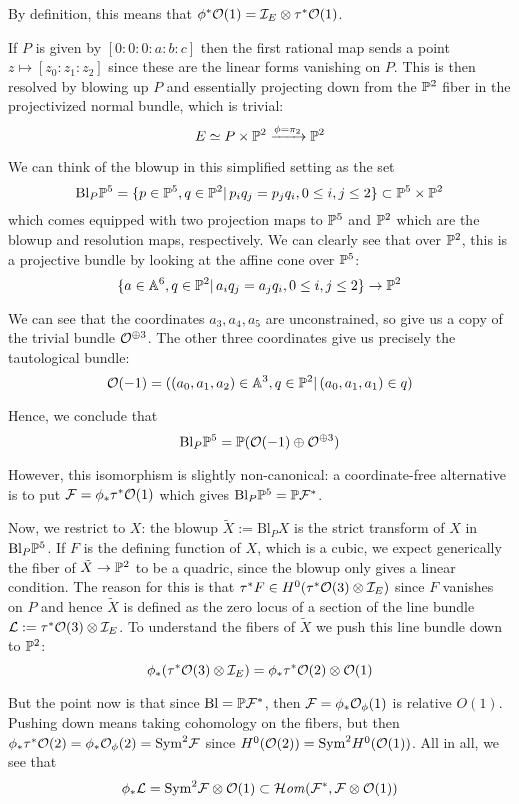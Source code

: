 By definition, this means that $\phi^* \O(1)=\calI_E \otimes \tau^*\O(1)$.

If $P$ is given by $[0:0:0:a:b:c]$ then the first rational map sends a point $z \mapsto [z_0:z_1:z_2]$ since these are the linear forms vanishing on $P$. This is then resolved by blowing up $P$ and essentially projecting down from the $\P^2$ fiber in the projectivized normal bundle, which is trivial:  $$E \simeq P \times \P^2 \xrightarrow{\phi = \pi_2} \P^2$$

We can think of the blowup in this simplified setting as the set $$\mathrm{Bl}_P \P^5 = \{p\in \P^5, q\in \P^2 |\, p_iq_j=p_jq_i, 0\leq i,j \leq 2\} \subset \P^5 \times \P^2$$
which comes equipped with two projection maps to $\P^5$ and $\P^2$ which are the blowup and resolution maps, respectively. We can clearly see that over $\P^2$, this is a projective bundle by looking at the affine cone over $\P^5$: $$\{ a\in \A^6, q\in \P^2|\,a_iq_j=a_jq_i, 0\leq i,j \leq 2\}\rightarrow \P^2$$

We can see that the coordinates $a_3, a_4, a_5$ are unconstrained, so give us a copy of the trivial bundle $\O^{\oplus 3}$. The other three coordinates give us precisely the tautological bundle: $$\O(-1)=((a_0,a_1,a_2)\in \A^3, q\in \P^2|\, (a_0, a_1, a_1)\in q)$$

Hence, we conclude that $$\mathrm{Bl}_P \P^5 = \P (\O(-1)\oplus \O^{\oplus 3})$$

However, this isomorphism is slightly non-canonical: a coordinate-free alternative is to put $\calF = \phi_* \tau^* \O(1)$ which gives $\mathrm{Bl}_P \P^5 = \P \calF^*$.

Now, we restrict to $X$: the blowup $\tilde{X}:=\mathrm{Bl}_P X$ is the strict transform of $X$ in $\mathrm{Bl}_P \P^5$. If $F$ is the defining function of $X$, which is a cubic, we expect generically the fiber of $\tilde{X}\rightarrow \P^2$ to be a quadric, since the blowup only gives a linear condition. The reason for this is that $\tau^*F \in H^0(\tau^* \O(3) \otimes \calI_E)$ since $F$ vanishes on $P$ and hence $\tilde{X}$ is defined as the zero locus of a section of the line bundle $\calL := \tau^* \O(3) \otimes \calI_E$. To understand the fibers of $\tilde{X}$ we push this line bundle down to $\P^2$: $$\phi_*(\tau^* \O(3) \otimes \calI_E)=\phi_* \tau^* \O(2) \otimes \O(1)$$

But the point now is that since $\mathrm{Bl}=\P \calF^*$, then $\calF =\phi_* \O_\phi(1)$ is relative $O(1)$. Pushing down means taking cohomology on the fibers, but then $\phi_* \tau^* \O(2)=\phi_* \O_\phi(2)=\mathrm{Sym}^2 \calF$ since $H^0(\O(2))=\mathrm{Sym}^2 H^0(\O(1))$. All in all, we see that $$\phi_* \calL = \mathrm{Sym}^2 \calF \otimes \O(1)\subset\lHom (\calF^* , \calF \otimes \O(1))$$

